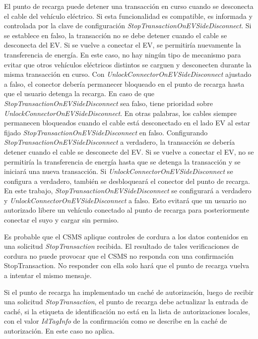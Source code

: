 \documentclass[12pt,a4paper,onecolumn,oneside]{report}
\begin{document}
El punto de recarga puede detener una transacción en curso cuando se desconecta el cable del vehículo eléctrico. Si esta funcionalidad es compatible, es informada y controlada por la clave de configuración \textit{StopTransactionOnEVSideDisconnect}. Si se establece en falso, la transacción no se debe detener cuando el cable se desconecta del EV. Si se vuelve a conectar el EV, se permitiría nuevamente la transferencia de energía. En este caso, no hay ningún tipo de mecanismo para evitar que otros vehículos eléctricos distintos se carguen y desconecten durante la misma transacción en curso. Con \textit{UnlockConnectorOnEVSideDisconnect} ajustado a falso, el conector debería permanecer bloqueado en el punto de recarga hasta que el usuario detenga la recarga. En caso de que \textit{StopTransactionOnEVSideDisconnect} sea falso, tiene prioridad sobre \textit{UnlockConnectorOnEVSideDisconnect}. En otras palabras, los cables siempre permanecen bloqueados cuando el cable está desconectado en el lado EV al estar fijado \textit{StopTransactionOnEVSideDisconnect} en falso. Configurando \textit{StopTransactionOnEVSideDisconnect} a verdadero, la transacción se debería detener cuando el cable se desconecte del EV. Si se vuelve a conectar el EV, no se permitiría la transferencia de energía hasta que se detenga la transacción y se iniciará una nueva transacción. Si \textit{UnlockConnectorOnEVSideDisconnect} se configura a verdadero, también se desbloqueará el conector del punto de recarga. En este trabajo, \textit{StopTransactionOnEVSideDisconnect} se configurará a verdadero y  \textit{UnlockConnectorOnEVSideDisconnect} a falso. Esto evitará que un usuario no autorizado libere un vehículo conectado al punto de recarga para posteriormente conectar el suyo y cargar sin permiso.

Es probable que el CSMS aplique controles de cordura a los datos contenidos en una solicitud \textit{StopTransaction} recibida. El resultado de tales verificaciones de cordura no puede provocar que el CSMS no responda con una confirmación StopTransaction. No responder con ella solo hará que el punto de recarga vuelva a intentar el mismo mensaje.

Si el punto de recarga ha implementado un caché de autorización, luego de recibir una solicitud \textit{StopTransaction}, el punto de recarga debe actualizar la entrada de caché, si la etiqueta de identificación no está en la lista de autorizaciones locales, con el valor \textit{IdTagInfo} de la confirmación como se describe en la caché de autorización. En este caso no aplica.
\end{document}

